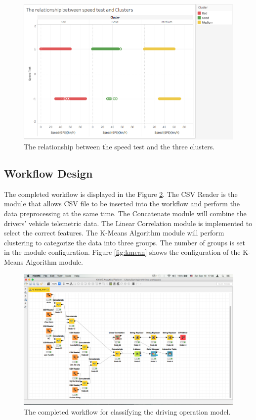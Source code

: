 \begin{figure}[hbt!]\centering
\includegraphics[height=.5\textwidth]{image/clusterresult}
\caption{The relationship between the speed test and the three clusters.}
\label{fig:cluster_result}
\end{figure}


\subsection{Workflow Design}
The completed workflow is displayed in the Figure \ref{fig:workflow}. The CSV Reader is the module that allows CSV file to be inserted into the workflow and perform the data preprocessing at the same time. The Concatenate module will combine the drivers' vehicle telemetric data. The Linear Correlation module is implemented to select the correct features. The K-Means Algorithm module will perform clustering to categorize the data into three groups. The number of groups is set in the module configuration. Figure \ref{fig:kmean} shows the configuration of the K-Means Algorithm module.

\begin{figure}[hbt!]\centering
\includegraphics[width=.75\textwidth]{image/KNIMEfile}
\caption{The completed workflow for classifying the driving operation model.}
\label{fig:workflow}
\end{figure}

